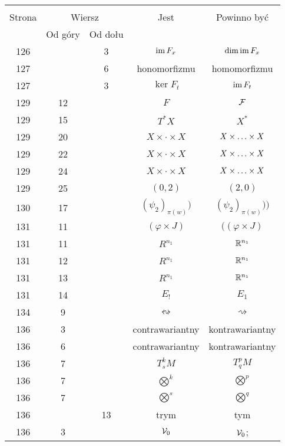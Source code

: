 \documentclass[a4paper,11pt]{article}
\begin{document}
\begin{center}
  \begin{tabular}{|c|c|c|c|c|}
    \hline
    & \multicolumn{2}{c|}{} & & \\
    Strona & \multicolumn{2}{c|}{Wiersz} & Jest
                              & Powinno być \\ \cline{2-3}
    & Od góry & Od dołu & & \\
    \hline
    126 & &  3 & $\mathrm{im} \, F_{ x }$ & $\dim\mathrm{im} \, F_{ x }$ \\
    127 & &  6 & honomorfizmu & homomorfizmu \\
    127 & &  3 & $\ker F_{ t }$ & $\mathrm{im} \, F_{ t }$ \\
    129 & 12 & & $F$ & $\mathcal{F}$ \\
    129 & 15 & & $T^{ * }X$ & $X^{ * }$ \\
    129 & 20 & & $X \times \cdot \times X$ & $X \times \ldots \times X$ \\
    129 & 22 & & $X \times \cdot \times X$ & $X \times \ldots \times X$ \\
    129 & 24 & & $X \times \cdot \times X$ & $X \times \ldots \times X$ \\
    129 & 25 & & $( 0, 2 )$ & $( 2, 0 )$ \\
    130 & 17 & & $( \psi_{ 2 } )_{ \pi( w ) })$
           & $( \psi_{ 2 } )_{ \pi( w ) }) \big)$ \\
    131 & 11 & & $( \varphi \times J )$ & $( ( \varphi \times J )$ \\
    131 & 11 & & $R^{ n_{ 1 } }$ & $\mathbb{R}^{ n_{ 1 } }$ \\
    131 & 12 & & $R^{ n_{ 1 } }$ & $\mathbb{R}^{ n_{ 1 } }$ \\
    131 & 13 & & $R^{ n_{ 1 } }$ & $\mathbb{R}^{ n_{ 1 } }$ \\
    131 & 14 & & $E_{ ! }$ & $E_{ 1 }$ \\
    134 &  9 & & $\leftrightsquigarrow$ & $\rightsquigarrow$ \\
    136 &  3 & & contrawariantny & kontrawariantny \\
    136 &  6 & & contrawariantny & kontrawariantny \\
    136 &  7 & & $T^{ k }_{ s }M$ & $T^{ p }_{ q }M$ \\
    136 &  7 & & $\bigotimes^{ k }$ & $\bigotimes^{ p }$ \\
    136 &  7 & & $\bigotimes^{ s }$ & $\bigotimes^{ q }$ \\
    136 & & 13 & trym & tym \\
    136 &  3 & & $\mathcal{V}_{ 0 }$ & $\mathcal{V}_{ 0 }$; \\

\end{tabular}
\end{center}
\end{document}
